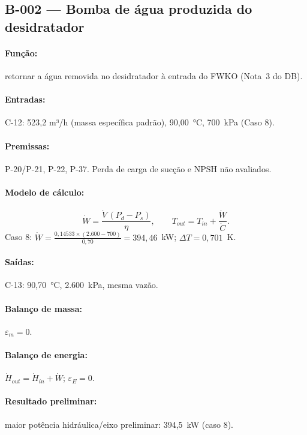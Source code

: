 \documentclass[11pt,a4paper]{article}
\numberwithin{equation}{section}
\numberwithin{table}{section}
\numberwithin{figure}{section}
\begin{document}
\subsection{B-002 --- Bomba de água produzida do desidratador}
\paragraph{Função:} retornar a água removida no desidratador à entrada do FWKO (Nota~3 do DB).
\paragraph{Entradas:} C-12: 523,2 m³/h (massa específica padrão), 90,00~\si{\celsius}, 700~\si{\kilo\pascal} (Caso 8).
\paragraph{Premissas:} P-20/P-21, P-22, P-37. Perda de carga de sucção e NPSH não avaliados.
\paragraph{Modelo de cálculo:}
\begin{equation}
\dot W=\frac{\dot V\,(P_{d}-P_{s})}{\eta},\qquad T_{out}=T_{in}+\frac{\dot W}{\dot C}.
\end{equation}
Caso 8: $\dot W=\frac{0{,}14533\times(2.600-700)}{0{,}70}=394{,}46$~\si{\kilo\watt}; $\Delta T=0{,}701$~\si{\kelvin}.

\paragraph{Saídas:} C-13: 90,70~\si{\celsius}, 2.600~\si{\kilo\pascal}, mesma vazão.
\paragraph{Balanço de massa:} $\varepsilon_m=$$0$.
\paragraph{Balanço de energia:} $\dot H_{out}=\dot H_{in}+\dot W$; $\varepsilon_E=$$0$.
\paragraph{Resultado preliminar:} maior potência hidráulica/eixo preliminar: 394,5~\si{\kilo\watt} (caso 8).
\end{document}
